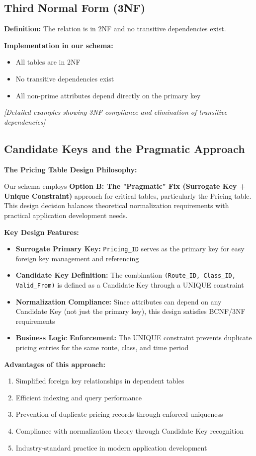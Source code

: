 \documentclass[12pt,a4paper,openany]{report}
\begin{document}
\subsection{Third Normal Form (3NF)}
\textbf{Definition:} The relation is in 2NF and no transitive dependencies exist.

\textbf{Implementation in our schema:}
\begin{itemize}
    \item All tables are in 2NF
    \item No transitive dependencies exist
    \item All non-prime attributes depend directly on the primary key
\end{itemize}

\textit{[Detailed examples showing 3NF compliance and elimination of transitive dependencies]}

\subsection{Candidate Keys and the Pragmatic Approach}

\textbf{The Pricing Table Design Philosophy:}

Our schema employs \textbf{Option B: The "Pragmatic" Fix (Surrogate Key + Unique Constraint)} approach for critical tables, particularly the Pricing table. This design decision balances theoretical normalization requirements with practical application development needs.

\textbf{Key Design Features:}
\begin{itemize}
    \item \textbf{Surrogate Primary Key:} \texttt{Pricing\_ID} serves as the primary key for easy foreign key management and referencing
    \item \textbf{Candidate Key Definition:} The combination \texttt{(Route\_ID, Class\_ID, Valid\_From)} is defined as a Candidate Key through a UNIQUE constraint
    \item \textbf{Normalization Compliance:} Since attributes can depend on any Candidate Key (not just the primary key), this design satisfies BCNF/3NF requirements
    \item \textbf{Business Logic Enforcement:} The UNIQUE constraint prevents duplicate pricing entries for the same route, class, and time period
\end{itemize}

\textbf{Advantages of this approach:}
\begin{enumerate}
    \item Simplified foreign key relationships in dependent tables
    \item Efficient indexing and query performance
    \item Prevention of duplicate pricing records through enforced uniqueness
    \item Compliance with normalization theory through Candidate Key recognition
    \item Industry-standard practice in modern application development
\end{enumerate}
\end{document}
